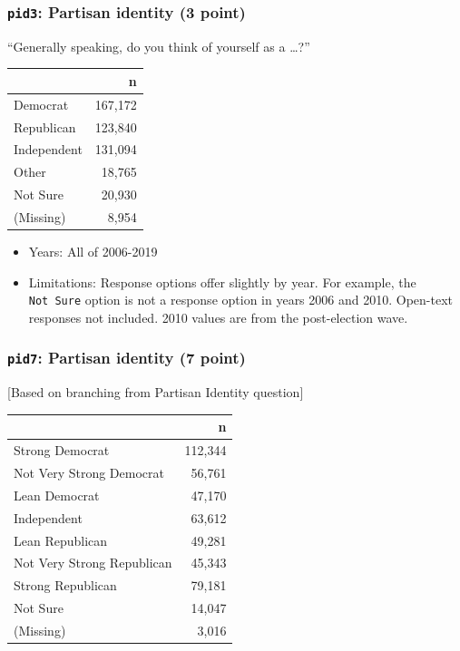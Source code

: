\documentclass[10pt,article,oneside]{memoir}
\theoremstyle{definition}
\begin{document}
\hypertarget{pid3-partisan-identity-3-point}{%
\subsubsection{\texorpdfstring{\texttt{pid3}: Partisan identity (3
point)}{pid3: Partisan identity (3 point)}}\label{pid3-partisan-identity-3-point}}

``Generally speaking, do you think of yourself as a \ldots?''

\begin{table}[H]
\centering
\begin{tabular}{lr}
\toprule
 & n\\
\midrule
Democrat & 167,172\\
Republican & 123,840\\
Independent & 131,094\\
Other & 18,765\\
Not Sure & 20,930\\
(Missing) & 8,954\\
\bottomrule
\end{tabular}
\end{table}

\begin{itemize}
\tightlist
\item
  Years: All of 2006-2019
\item
  Limitations: Response options offer slightly by year. For example, the
  \texttt{Not\ Sure} option is not a response option in years 2006 and
  2010. Open-text responses not included. 2010 values are from the
  post-election wave.
\end{itemize}

\hypertarget{pid7-partisan-identity-7-point}{%
\subsubsection{\texorpdfstring{\texttt{pid7}: Partisan identity (7
point)}{pid7: Partisan identity (7 point)}}\label{pid7-partisan-identity-7-point}}

{[}Based on branching from Partisan Identity question{]}

\begin{table}[H]
\centering
\begin{tabular}{lr}
\toprule
 & n\\
\midrule
Strong Democrat & 112,344\\
Not Very Strong Democrat & 56,761\\
Lean Democrat & 47,170\\
Independent & 63,612\\
Lean Republican & 49,281\\
Not Very Strong Republican & 45,343\\
Strong Republican & 79,181\\
Not Sure & 14,047\\
(Missing) & 3,016\\
\bottomrule
\end{tabular}
\end{table}
\end{document}
